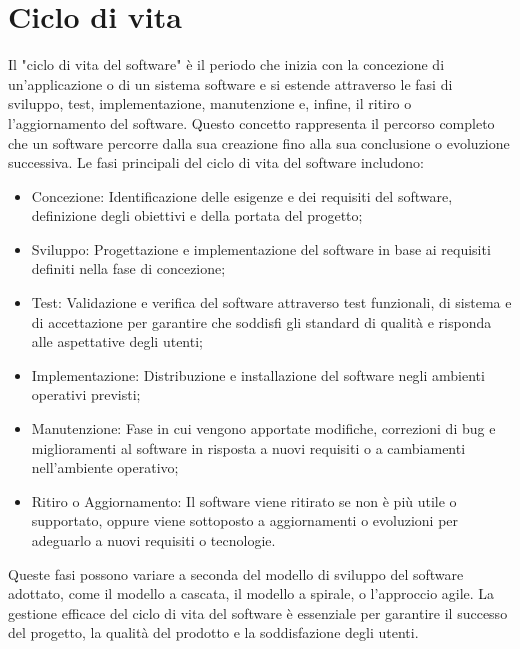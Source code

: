 \documentclass{article}
\begin{document}
\section{Ciclo di vita}
Il "ciclo di vita del software" è il periodo che inizia con la concezione di un'applicazione o di un sistema software e si estende attraverso le fasi di sviluppo, test, implementazione, manutenzione e, infine, il ritiro o l'aggiornamento del software. Questo concetto rappresenta il percorso completo che un software percorre dalla sua creazione fino alla sua conclusione o evoluzione successiva. Le fasi principali del ciclo di vita del software includono:
\begin{itemize}
    \item Concezione: Identificazione delle esigenze e dei requisiti del software, definizione degli obiettivi e della portata del progetto;
    \item Sviluppo: Progettazione e implementazione del software in base ai requisiti definiti nella fase di concezione;
    \item Test: Validazione e verifica del software attraverso test funzionali, di sistema e di accettazione per garantire che soddisfi gli standard di qualità e risponda alle aspettative degli utenti;
    \item Implementazione: Distribuzione e installazione del software negli ambienti operativi previsti;
    \item Manutenzione: Fase in cui vengono apportate modifiche, correzioni di bug e miglioramenti al software in risposta a nuovi requisiti o a cambiamenti nell'ambiente operativo;
    \item Ritiro o Aggiornamento: Il software viene ritirato se non è più utile o supportato, oppure viene sottoposto a aggiornamenti o evoluzioni per adeguarlo a nuovi requisiti o tecnologie.
\end{itemize}
Queste fasi possono variare a seconda del modello di sviluppo del software adottato, come il modello a cascata, il modello a spirale, o l'approccio agile. La gestione efficace del ciclo di vita del software è essenziale per garantire il successo del progetto, la qualità del prodotto e la soddisfazione degli utenti.
\end{document}

